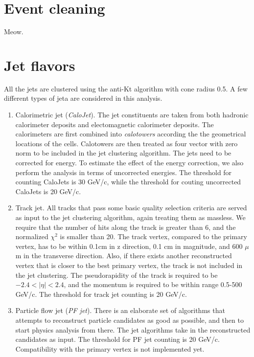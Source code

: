 \documentclass[10pt,a4paper,onecolumn]{article}
\begin{document}
\section{Event cleaning}

Meow.

\section{Jet flavors}

All the jets are clustered using the anti-Kt algorithm with cone radius 0.5.  A few different types of jeta are considered in
this analysis.

\begin{enumerate}
\item Calorimetric jet (\emph{CaloJet}).  The jet constituents are taken from both hadronic calorimeter deposits and electomagnetic calorimeter deposits.
   The calorimeters are first combined into \emph{calotowers} according the the geometrical locations of the cells.
   Calotowers are then treated as four vector with zero norm to be included in the jet clustering algorithm.
   The jets need to be corrected for energy.  To estimate the effect of the energy correction, we also perform the analysis in terms of uncorrected energies.
   The threshold for counting CaloJets is 30 GeV/c, while the threshold for couting uncorrected CaloJets is 20 GeV/c.
\item Track jet.  All tracks that pass some basic quality selection criteria are served as input to the jet clustering algorithm, again treating them as massless.
   We require that the number of hits along the track is greater than 6, and the normalized $\chi^2$ is smaller than 20.
   The track vertex, compared to the primary vertex, has to be within 0.1cm in z direction, 0.1 cm in magnitude, and 600 $\mu$m in the transverse direction.
   Also, if there exists another reconstructed vertex that is closer to the best primary vertex, the track is not included in the jet clustering.
   The pseudorapidity of the track is required to be $-2.4 < |\eta| < 2.4$, and the momentum is required to be within range 0.5-500 GeV/c.
   The threshold for track jet counting is 20 GeV/c.
\item Particle flow jet (\emph{PF jet}).  There is an elaborate set of algorithms that attempts to reconstruct particle candidates as good as possible,
   and then to start physics analysis from there.  The jet algorithms take in the reconstructed candidates as input.
   The threshold for PF jet counting is 20 GeV/c.  Compatibility with the primary vertex is not implemented yet.
\end{enumerate}
\end{document}
